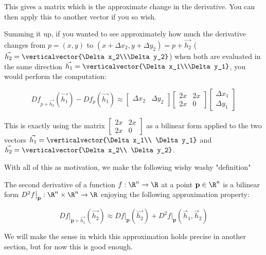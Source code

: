 \documentclass{ximera}
\begin{document}
This gives a matrix which is the approximate change in the derivative.  You can then apply this to another vector if you so wish.  

Summing it up, if you wanted to see approximately how much the derivative changes from $p = (x,y)$ to $(x+\Delta x_2,y+\Delta y_2) = p+\vec{h_2}$ 
($\vec{h_2} = \verticalvector{\Delta x_2\\\Delta y_2}$)
when both are evaluated in the same direction  $\vec{h_1} = \verticalvector{\Delta x_1\\\Delta y_1}$, you would perform the computation:

\[ 
Df_{p+\vec{h_2}}(\vec{h_1})  -Df_p(\vec{h_1}) \approx
\begin{bmatrix} 
\Delta x_2 & \Delta y_2\end{bmatrix} 
 \begin{bmatrix} 2x&2x\\2x&0\end{bmatrix} \begin{bmatrix} \Delta x_1\\ \Delta y_1\end{bmatrix}
 \]
 
 This is exactly using the matrix $\begin{bmatrix} 2x&2x\\2x&0\end{bmatrix}$ as a bilinear form applied to the two vectors 
 $\vec{h_1} = \verticalvector{\Delta x_1\\ \Delta y_1}$ and $\vec{h_2} = \verticalvector{\Delta x_2\\ \Delta y_2}$.
 
With all of this as motivation, we make the following wishy washy "definition"

\begin{definition}
	The second derivative of a function $f:\R^n \to \R$ at a point $\mathbf{p}\in \R^n$  
	is a bilinear form $D^2f\big|_\mathbf{p} : \R^n \times \R^n \to \R$ enjoying the following approximation property:
	
	\[
		Df\big|_{\mathbf{p}+\vec{h_1}}(\vec{h_2})  \approx Df\big|_\mathbf{p}(\vec{h_2}) + D^2f\big|_\mathbf{p} (\vec{h}_1,\vec{h}_2)
	\]
	
\end{definition} 

We will make the sense in which this approximation holds precise in another section, but for now this is good enough.
\end{document}
